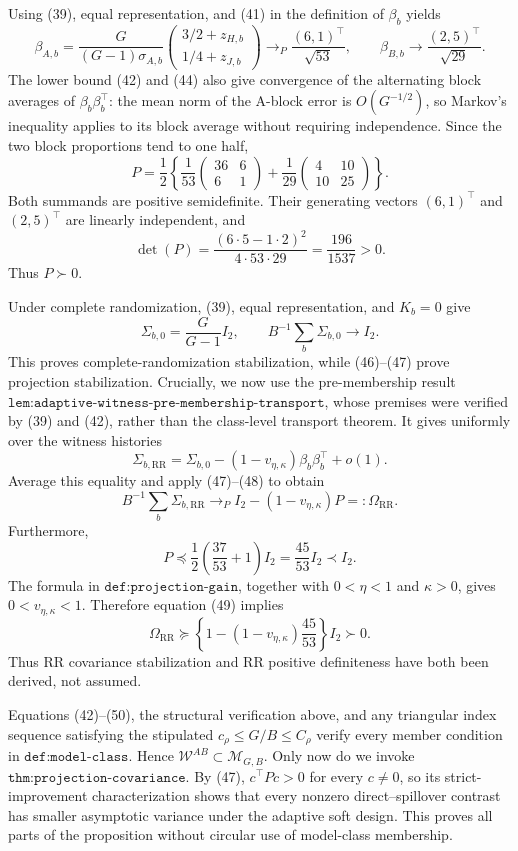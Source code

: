 Using (39), equal representation, and (41) in the definition of \(\beta_b\) yields
\[
 \beta_{A,b}
 =\frac{G}{(G-1)\sigma_{A,b}}
   \begin{pmatrix}3/2+z_{H,b}\\1/4+z_{J,b}\end{pmatrix}
 \longrightarrow_P\frac{(6,1)^\top}{\sqrt{53}},
 \qquad
 \beta_{B,b}\longrightarrow\frac{(2,5)^\top}{\sqrt{29}}. \tag{46}
\]
The lower bound (42) and (44) also give convergence of the alternating block averages of \(\beta_b\beta_b^\top\): the mean norm of the A-block error is \(O(G^{-1/2})\), so Markov's inequality applies to its block average without requiring independence.  Since the two block proportions tend to one half,
\[
 P=\frac12\left\{
 \frac1{53}\begin{pmatrix}36&6\\6&1\end{pmatrix}
 +\frac1{29}\begin{pmatrix}4&10\\10&25\end{pmatrix}
 \right\}.                                                   \tag{47}
\]
Both summands are positive semidefinite.  Their generating vectors \((6,1)^\top\) and \((2,5)^\top\) are linearly independent, and
\[
 \det(P)=\frac{(6\cdot5-1\cdot2)^2}{4\cdot53\cdot29}
 =\frac{196}{1537}>0.
\]
Thus \(P\succ0\).

Under complete randomization, (39), equal representation, and \(K_b=0\) give
\[
 \Sigma_{b,0}=\frac G{G-1}I_2,
 \qquad B^{-1}\sum_b\Sigma_{b,0}\longrightarrow I_2.       \tag{48}
\]
This proves complete-randomization stabilization, while (46)--(47) prove projection stabilization.  Crucially, we now use the pre-membership result \(\texttt{lem:adaptive-witness-pre-membership-transport}\), whose premises were verified by (39) and (42), rather than the class-level transport theorem.  It gives uniformly over the witness histories
\[
 \Sigma_{b,\mathrm{RR}}
 =\Sigma_{b,0}-(1-v_{\eta,\kappa})\beta_b\beta_b^\top+o(1).
\]
Average this equality and apply (47)--(48) to obtain
\[
 B^{-1}\sum_b\Sigma_{b,\mathrm{RR}}
 \longrightarrow_P I_2-(1-v_{\eta,\kappa})P
 =:\Omega_{\mathrm{RR}}.                                   \tag{49}
\]
Furthermore,
\[
 P\preceq\frac12\left(\frac{37}{53}+1\right)I_2
 =\frac{45}{53}I_2\prec I_2.
\]
The formula in \(\texttt{def:projection-gain}\), together with \(0<\eta<1\) and \(\kappa>0\), gives \(0<v_{\eta,\kappa}<1\).  Therefore equation (49) implies
\[
 \Omega_{\mathrm{RR}}\succeq
 \left\{1-(1-v_{\eta,\kappa})\frac{45}{53}\right\}I_2\succ0. \tag{50}
\]
Thus RR covariance stabilization and RR positive definiteness have both been derived, not assumed.

Equations (42)--(50), the structural verification above, and any triangular index sequence satisfying the stipulated \(c_\rho\leq G/B\leq C_\rho\) verify every member condition in \(\texttt{def:model-class}\).  Hence \(\mathcal W^{AB}\subset\mathcal M_{G,B}\).  Only now do we invoke \(\texttt{thm:projection-covariance}\).  By (47), \(c^\top Pc>0\) for every \(c\neq0\), so its strict-improvement characterization shows that every nonzero direct--spillover contrast has smaller asymptotic variance under the adaptive soft design.  This proves all parts of the proposition without circular use of model-class membership.